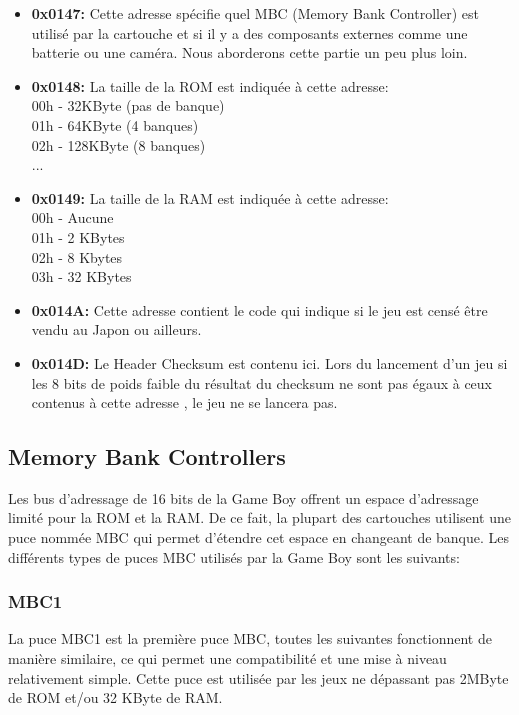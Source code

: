 \documentclass{report}
\begin{document}
\begin{itemize}
\item \textbf{0x0147:} Cette adresse spécifie quel MBC (Memory Bank Controller) est utilisé par la cartouche et si il y a des composants externes comme une batterie ou une caméra. Nous aborderons cette partie un peu plus loin.\\

\item \textbf{0x0148:} La taille de la ROM est indiquée à cette adresse:
\\00h -  32KByte (pas de banque)
\\01h -  64KByte (4 banques)
\\02h - 128KByte (8 banques)
\\...

\item \textbf{0x0149:} La taille de la RAM est indiquée à cette adresse:
\\00h - Aucune
\\01h - 2 KBytes
\\02h - 8 Kbytes
\\03h - 32 KBytes\\

\item \textbf{0x014A:} Cette adresse contient le code qui indique si le jeu est censé être vendu au Japon ou ailleurs.\\

\item \textbf{0x014D:} Le Header Checksum est contenu ici. Lors du lancement d'un jeu si les 8 bits de poids faible du résultat du checksum ne sont pas égaux à ceux contenus à cette adresse , le jeu ne se lancera pas.\\

\end{itemize}

\subsection{Memory Bank Controllers}
Les bus d'adressage de 16 bits de la Game Boy offrent un espace d'adressage limité pour la ROM et la RAM. De ce fait, la plupart des cartouches utilisent une puce nommée MBC qui permet d'étendre cet espace en changeant de banque. Les différents types de puces MBC utilisés par la Game Boy sont les suivants:\\

\subsubsection{MBC1}
	La puce MBC1 est la première puce MBC, toutes les suivantes fonctionnent de manière similaire, ce qui permet une compatibilité et une mise à niveau relativement simple. Cette puce est utilisée par les jeux ne dépassant pas 2MByte de ROM et/ou 32 KByte de RAM.
\end{document}
